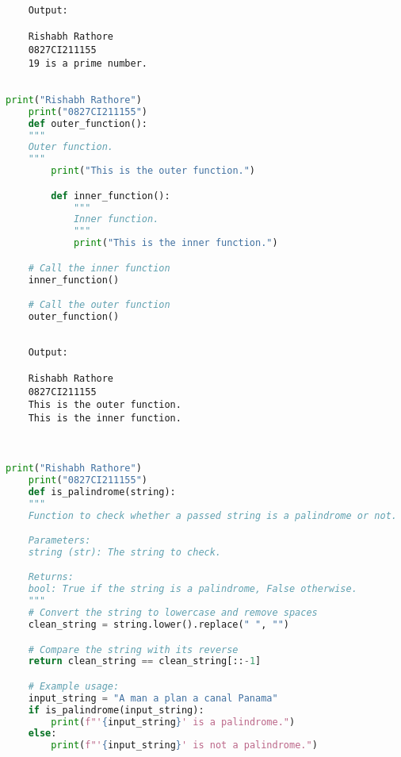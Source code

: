 \documentclass{report}
\begin{document}
\begin{verbatim}
	Output:

	Rishabh Rathore
	0827CI211155
	19 is a prime number.
	

\end{verbatim}


\newpage


\sol 
\begin{lstlisting}[language=Python]
	print("Rishabh Rathore")
	print("0827CI211155")
	def outer_function():
    """
    Outer function.
    """
		print("This is the outer function.")

		def inner_function():
			"""
			Inner function.
			"""
			print("This is the inner function.")

    # Call the inner function
    inner_function()

	# Call the outer function
	outer_function()
  

\end{lstlisting}

\begin{verbatim}
	Output:

	Rishabh Rathore
	0827CI211155
	This is the outer function.
	This is the inner function.
	
	

\end{verbatim}


\newpage


\sol 
\begin{lstlisting}[language=Python]
	print("Rishabh Rathore")
	print("0827CI211155")
	def is_palindrome(string):
    """
    Function to check whether a passed string is a palindrome or not.

    Parameters:
    string (str): The string to check.

    Returns:
    bool: True if the string is a palindrome, False otherwise.
    """
    # Convert the string to lowercase and remove spaces
    clean_string = string.lower().replace(" ", "")

    # Compare the string with its reverse
    return clean_string == clean_string[::-1]

	# Example usage:
	input_string = "A man a plan a canal Panama"
	if is_palindrome(input_string):
		print(f"'{input_string}' is a palindrome.")
	else:
		print(f"'{input_string}' is not a palindrome.")
  

\end{lstlisting}
\end{document}
